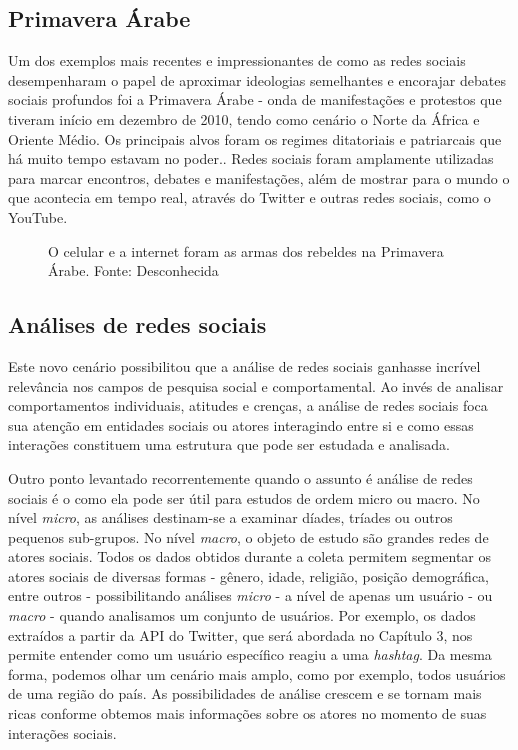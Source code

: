 \subsection{Primavera Árabe}
Um dos exemplos mais recentes e impressionantes de como as redes sociais desempenharam o papel de aproximar ideologias semelhantes e encorajar debates sociais profundos foi a Primavera Árabe - onda de manifestações e protestos que tiveram início em dezembro de 2010, tendo como cenário o Norte da África e Oriente Médio. Os principais alvos foram os regimes ditatoriais e patriarcais que há muito tempo estavam no poder.\cite{howard2011opening}. Redes sociais foram amplamente utilizadas para marcar encontros, debates e manifestações, além de mostrar para o mundo o que acontecia em tempo real, através do Twitter e outras redes sociais, como o YouTube.

\begin{figure}[!h]
	\centering{}
	\caption{O celular e a internet foram as armas dos rebeldes na Primavera Árabe. Fonte: Desconhecida}
	\label{uni}
\end{figure}

\subsection{Análises de redes sociais}
Este novo cenário possibilitou que a análise de redes sociais ganhasse incrível relevância nos campos de pesquisa social e comportamental\cite{wasserman1994advances}. Ao invés de analisar comportamentos individuais, atitudes e crenças, a análise de redes sociais foca sua atenção em entidades sociais ou atores interagindo entre si e como essas interações constituem uma estrutura que pode ser estudada e analisada.

Outro ponto levantado recorrentemente quando o assunto é análise de redes sociais é o como ela pode ser útil para estudos de ordem micro ou macro. No nível \textit{micro}, as análises destinam-se a examinar díades, tríades ou outros pequenos sub-grupos. No nível \textit{macro}, o objeto de estudo são grandes redes de atores sociais.
Todos os dados obtidos durante a coleta permitem segmentar os atores sociais de diversas formas - gênero, idade, religião, posição demográfica, entre outros - possibilitando análises \textit{micro} - a nível de apenas um usuário - ou \textit{macro} - quando analisamos um conjunto de usuários. Por exemplo, os dados extraídos a partir da API do Twitter, que será abordada no Capítulo 3, nos permite entender como um usuário específico reagiu a uma \textit{hashtag}. Da mesma forma, podemos olhar um cenário mais amplo, como por exemplo, todos usuários de uma região do país. As possibilidades de análise crescem e se tornam mais ricas conforme obtemos mais informações sobre os atores no momento de suas interações sociais.


